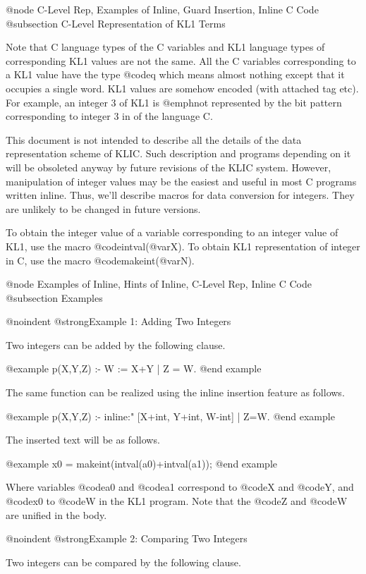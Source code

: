 {@node C-Level Rep, Examples of Inline, Guard Insertion, Inline C Code
@subsection C-Level Representation of KL1 Terms

Note that C language types of the C variables and KL1 language types of
corresponding KL1 values are not the same.  All the C variables
corresponding to a KL1 value have the type @code{q} which means almost
nothing except that it occupies a single word.  KL1 values are somehow
encoded (with attached tag etc).  For example, an integer 3 of KL1 is
@emph{not} represented by the bit pattern corresponding to integer 3 in
of the language C.

This document is not intended to describe all the details of the data
representation scheme of KLIC.  Such description and programs depending
on it will be obsoleted anyway by future revisions of the KLIC system.
However, manipulation of integer values may be the easiest and useful in
most C programs written inline.  Thus, we'll describe macros for data
conversion for integers.  They are unlikely to be changed in future
versions.

To obtain the integer value of a variable corresponding to an integer
value of KL1, use the macro @code{intval(@var{X})}.  To obtain KL1
representation of integer in C, use the macro @code{makeint(@var{N})}.

@node Examples of Inline, Hints of Inline, C-Level Rep, Inline C Code
@subsection Examples

@noindent
@strong{Example 1: Adding Two Integers}

Two integers can be added by the following clause.

@example
    p(X,Y,Z) :- W := X+Y | Z = W.
@end example

The same function can be realized using the inline insertion feature
as follows.

@example
p(X,Y,Z) :-
  inline:"%
    [X+int, Y+int, W-int] | Z=W.
@end example

The inserted text will be as follows.

@example
x0 = makeint(intval(a0)+intval(a1));
@end example

Where variables @code{a0} and @code{a1} correspond to @code{X} and
@code{Y}, and @code{x0} to @code{W} in the KL1 program.  Note that the
@code{Z} and @code{W} are unified in the body.

@noindent
@strong{Example 2: Comparing Two Integers}

Two integers can be compared by the following clause.

}
